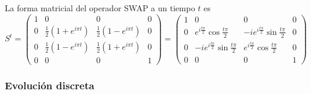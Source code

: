 La forma matricial del operador \textsc{SWAP} a un tiempo $t$ es
\begin{equation}\label{eq:SWAP(t)}
S^{t}=\begin{pmatrix}
 1 & 0 & 0 & 0 \\
 0 & \frac{1}{2}(1+e^{i \pi t}) & \frac{1}{2} (1-e^{i \pi t}) & 0 \\
 0 & \frac{1}{2}(1-e^{i \pi t}) & \frac{1}{2}(1+e^{i \pi t}) & 0 \\
 0 & 0 & 0 & 1
\end{pmatrix}=\begin{pmatrix}
  1 & 0 & 0 & 0 \\
  0 & e^{i\frac{t\pi}{2}}\cos{\frac{t\pi}{2}} & -ie^{i\frac{t\pi}{2}}\sin{\frac{t\pi}{2}} & 0 \\
  0 & -ie^{i\frac{t\pi}{2}}\sin{\frac{t\pi}{2}} & e^{i\frac{t\pi}{2}}\cos{\frac{t\pi}{2}}  & 0 \\
  0 & 0 & 0 & 1
 \end{pmatrix}
\end{equation}

\subsubsection{Evolución discreta}


